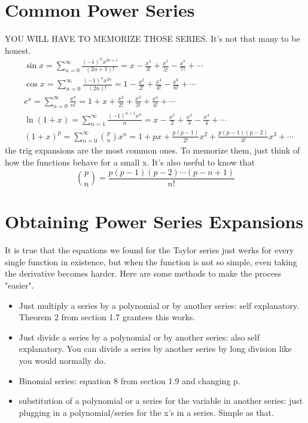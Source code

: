 \documentclass[oneside]{book}
\numberwithin{equation}{chapter} %
\begin{document}
\section{Common Power Series}
YOU WILL HAVE TO MEMORIZE THOSE SERIES. It's not that many to be honest. 
\begin{align}
	&\sin x=\sum^\infty_{n=0}\frac{(-1)^nx^{2n+1}}{(2n+1)!}=x-\frac{x^3}{3!}+\frac{x^5}{5!}-\frac{x^7}{7!}+\cdots\\
	&\cos x=\sum^\infty_{n=0}\frac{(-1)^nx^{2n}}{(2n)!}=1-\frac{x^2}{2!}+\frac{x^4}{4!}-\frac{x^6}{6!}+\cdots\\
	&e^x=\sum^\infty_{n=0}\frac{x^n}{n!}=1+x+\frac{x^2}{2!}+\frac{x^3}{3!}+\frac{x^4}{4!}+\cdots\\
	&\ln(1+x)=\sum^\infty_{n=1}\frac{(-1)^{n+1}x^n}{n}=x-\frac{x^2}2+\frac{x^3}3-\frac{x^4}4+\cdots\\
	&(1+x)^p=\sum^\infty_{n=0}\binom pnx^n=1+px+\frac{p(p-1)}{2!}x^2+\frac{p(p-1)(p-2)}{3!}x^3+\cdots
\end{align}
the trig expansions are the most common ones. To memorize them, just think of how the functions behave for a small x. It's also useful to know that 
\begin{equation}
	\binom pn=\frac{p(p-1)(p-2)\cdots(p-n+1)}{n!}
\end{equation}
\section{Obtaining Power Series Expansions}
It is true that the equations we found for the Taylor series just werks for every single function in existence, but when the function is not so simple, even taking the derivative becomes harder. Here are some methods to make the process "easier".
\begin{itemize}
	\item Just multiply a series by a polynomial or by another series: self explanatory. Theorem 2 from section 1.7 grantees this works.
	\item Just divide a series by a polynomial or by another series: also self explanatory. You can divide a series by another series by long division like you would normally do.
	\item Binomial series: equation 8 from section 1.9 and changing p.
	\item substitution of a polynomial or a series for the variable in another series: just plugging in a polynomial/series for the x's in a  series. Simple as that.
\end{itemize}
\end{document}
